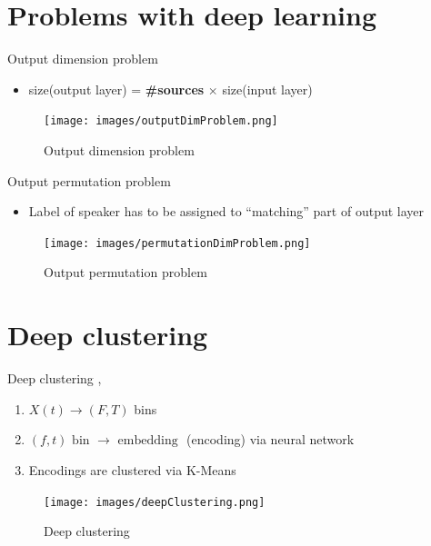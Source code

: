 \documentclass[xcolor=table,mathserif,9pt]{beamer}    %
\begin{document}
\section{Problems with deep learning}%
\label{sec:problems_with_deep_learning}
\begin{frame}{Output dimension problem \cite{SingleChannelSourceSeparation}}

\begin{itemize}
	\item size(output layer) = \textbf{\#sources} $\times$ size(input layer)
\end{itemize}

\begin{figure}[htpb]
	\centering
	\texttt{[image: images/outputDimProblem.png]}
	\caption{Output dimension problem}
\end{figure}

\end{frame}

\begin{frame}{Output permutation problem \cite{SingleChannelSourceSeparation}}
	\begin{itemize}
		\item Label of speaker has to be assigned to ``matching'' part of output layer
	\end{itemize}

	\begin{figure}[htpb]
		\centering
		\texttt{[image: images/permutationDimProblem.png]}
		\caption{Output permutation problem}
	\end{figure}

\end{frame}

\section{Deep clustering}%
\label{sec:deep_clustering}
\begin{frame}{Deep clustering \cite{SingleChannelSourceSeparation}, \cite{BasicDeepClustering:2016}}

\begin{enumerate}
	\item $X(t) \to (F,T)$ bins
	\item $(f,t) \text{ bin } \to \text{ embedding }$ (encoding) via neural network
	\item Encodings are clustered via K-Means
\end{enumerate}

\begin{figure}[htpb]
	\centering
	\texttt{[image: images/deepClustering.png]}
	\caption{Deep clustering \cite{DCFigure}}
\end{figure}

\end{frame}
\end{document}
